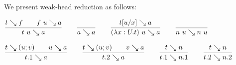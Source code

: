 \documentclass[a4paper,english]{lipics-utf8x}
\begin{document}
We present weak-head reduction as follows:

\begin{center}
\(
  \ru{t \rew f \qquad
      f~u \rew a
    }{t~u \rew a}
  \qquad
  \ru{}{a \rew a}
  \qquad
  \ru{t[u/x] \rew a
    }{(\lambda x:U.t)~u \rew a}
  \qquad
  \ru{}{n~u \rew n~u}
\)
\end{center}

\begin{center}
\(
  \ru{t \rew (u;v) \qquad
      u \rew a
    }{t.1 \rew a}
  \qquad
  \ru{t \rew (u;v) \qquad
      v \rew a
    }{t.2 \rew a}
  \qquad
  \ru{t \rew n
    }{t.1 \rew n.1}
  \qquad
  \ru{t \rew n
    }{t.2 \rew n.2}
\)
\end{center}
\end{document}
